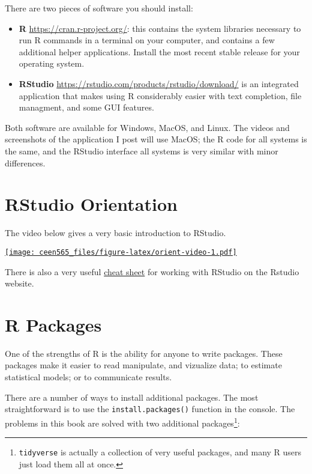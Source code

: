 \documentclass[]{book}
\providecommand{\tightlist}{%
  \setlength{\itemsep}{0pt}\setlength{\parskip}{0pt}}
\let\rmarkdownfootnote\footnote%
\def\footnote{\protect\rmarkdownfootnote}
\begin{document}
There are two pieces of software you should install:

\begin{itemize}
\tightlist
\item
  \textbf{R} \url{https://cran.r-project.org/}: this contains
  the system libraries necessary to run R commands in a terminal on your computer,
  and contains a few additional helper applications. Install the most recent
  stable release for your operating system.
\item
  \textbf{RStudio} \url{https://rstudio.com/products/rstudio/download/} is an integrated application that makes using R considerably easier
  with text completion, file managment, and some GUI features.
\end{itemize}

Both software are available for Windows, MacOS, and Linux. The videos and screenshots
of the application I post will use MacOS; the R code for all systems is the same,
and the RStudio interface all systems is very similar with minor differences.

\hypertarget{rstudio-orientation}{%
\section{RStudio Orientation}\label{rstudio-orientation}}

The video below gives a very basic introduction to RStudio.

\href{https://www.youtube.com/embed/c3xv8wOIj-g}{\texttt{[image: ceen565\_files/figure-latex/orient-video-1.pdf]}}

There is also a very useful \href{https://resources.rstudio.com/rstudio-cheatsheets/rstudio-ide-cheat-sheet}{cheat sheet}
for working with RStudio on the Rstudio website.

\hypertarget{r-packages}{%
\section{R Packages}\label{r-packages}}

One of the strengths of R is the ability for anyone to write packages. These
packages make it easier to read manipulate, and vizualize data; to estimate
statistical models; or to communicate results.

There are a number of ways to install additional packages. The most straightforward
is to use the \texttt{install.packages()} function in the console. The problems
in this book are solved with two additional packages\footnote{\texttt{tidyverse} is actually a collection
  of very useful packages, and many R users just load them all at once.}:
\end{document}
